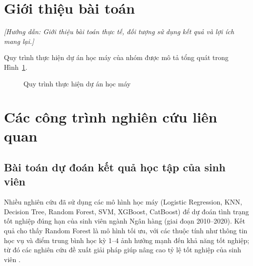 \documentclass[12pt,a4paper,oneside]{report}
\newcommand{\huongdan}[1]{{\color{guide}\itshape [Hướng dẫn: #1]}}
\begin{document}
\section{Giới thiệu bài toán}
\huongdan{Giới thiệu bài toán thực tế, đối tượng sử dụng kết quả và lợi ích
mang lại.}

Quy trình thực hiện dự án học máy của nhóm được mô tả tổng quát trong
Hình~\ref{fig:quytrinh}.

\begin{figure}[H]
  \centering
  \caption{Quy trình thực hiện dự án học máy}
  \label{fig:quytrinh}
\end{figure}

\section{Các công trình nghiên cứu liên quan}

\subsection{Bài toán dự đoán kết quả học tập của sinh viên}

Nhiều nghiên cứu đã sử dụng các mô hình học máy (Logistic Regression, KNN,
Decision Tree, Random Forest, SVM, XGBoost, CatBoost) để dự đoán tình trạng
tốt nghiệp đúng hạn của sinh viên ngành Ngân hàng (giai đoạn 2010--2020).
Kết quả cho thấy Random Forest là mô hình tối ưu, với các thuộc tính như
thông tin học vụ và điểm trung bình học kỳ 1--4 ảnh hưởng mạnh đến khả năng
tốt nghiệp; từ đó các nghiên cứu đề xuất giải pháp giúp nâng cao tỷ lệ tốt
nghiệp của sinh viên \cite{hai2017,thuan2022,thuy2023}.
\end{document}
